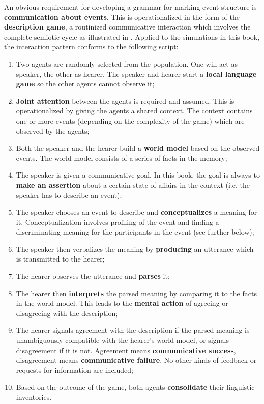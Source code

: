 An obvious requirement for developing a grammar for marking event structure is {\bfseries communication about events}. This is operationalized in the form of the {\bfseries description game}, a routinized communicative interaction which involves the complete semiotic cycle as illustrated in . Applied to the simulations in this book, the interaction pattern conforms to the following script:

\begin{enumerate}
\item Two agents are randomly selected from the population. One will act as speaker, the other as hearer. The speaker and hearer start a {\bfseries local language game} so the other agents cannot observe it;
\item {\bfseries Joint attention} \citep{tomasello95jointattention} between the agents is required and assumed. This is operationalized by giving the agents a shared context. The context contains one or more events (depending on the complexity of the game) which are observed by the agents;
\item Both the speaker and the hearer build a {\bfseries world model} based on the observed events. The world model consists of a series of facts in the memory;
\item The speaker is given a communicative goal. In this book, the goal is always to {\bfseries make an assertion} about a certain state of affairs in the context (i.e. the speaker has to describe an event);
\item The speaker chooses an event to describe and {\bfseries conceptualizes} a meaning for it. Conceptualization involves profiling of the event and finding a discriminating meaning for the participants in the event (see further below);
\item The speaker then verbalizes the meaning by {\bfseries producing} an utterance which is transmitted to the hearer;
\item The hearer observes the utterance and {\bfseries parses} it;
\item The hearer then {\bfseries interprets} the parsed meaning by comparing it to the facts in the world model. This leads to the {\bfseries mental action} of agreeing or disagreeing with the description;
\item The hearer signals agreement with the description if the parsed meaning is unambiguously compatible with the hearer's world model, or signals disagreement if it is not. Agreement means {\bfseries communicative success}, disagreement means {\bfseries communicative failure}. No other kinds of feedback or requests for information are included;
\item Based on the outcome of the game, both agents {\bfseries consolidate} their linguistic inventories. 
\end{enumerate}

